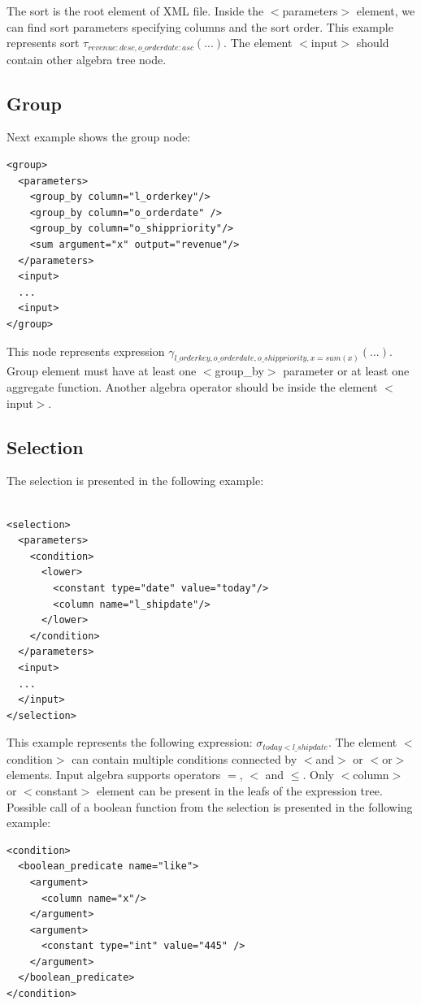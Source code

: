 The sort is the root element of XML file. Inside the $<$parameters$>$ element, we can find sort parameters specifying columns and the sort order. This example represents sort $\tau_{revenue:desc,o\_orderdate:asc}(...)$. The element $<$input$>$ should contain other algebra tree node.

\subsection{Group}

Next example shows the group node:

\begin{lstlisting}
<group>
  <parameters>
    <group_by column="l_orderkey"/>
    <group_by column="o_orderdate" />
    <group_by column="o_shippriority"/>
    <sum argument="x" output="revenue"/>
  </parameters>
  <input>
  ...
  <input>
</group>
\end{lstlisting}

This node represents expression $\gamma_{l\_orderkey,o\_orderdate,o\_shippriority,x=sum(x)}(...)$. \\Group element must have at least one $<$group\_by$>$  parameter or at least one aggregate function.  Another algebra operator should be inside the element $<$input$>$.

\subsection{Selection}

The selection is presented in the following example:

\begin{lstlisting}

<selection>
  <parameters>
    <condition>
      <lower>
        <constant type="date" value="today"/>
        <column name="l_shipdate"/>
      </lower>
    </condition>
  </parameters>
  <input>
  ...
  </input>
</selection>
\end{lstlisting}
This example represents the following expression: $\sigma_{today<l\_shipdate}$. The element $<$condition$>$ can contain multiple conditions connected by $<$and$>$ or $<$or$>$ elements. Input algebra supports operators $=$, $<$ and $\leq$.  Only $<$column$>$ or $<$constant$>$ element can be present in the leafs of the expression tree. Possible call of a boolean function from the selection is presented in the following example:

\begin{lstlisting}
<condition>
  <boolean_predicate name="like">
    <argument>
      <column name="x"/>
    </argument>
    <argument>
      <constant type="int" value="445" />
    </argument>
  </boolean_predicate>
</condition>
\end{lstlisting}

